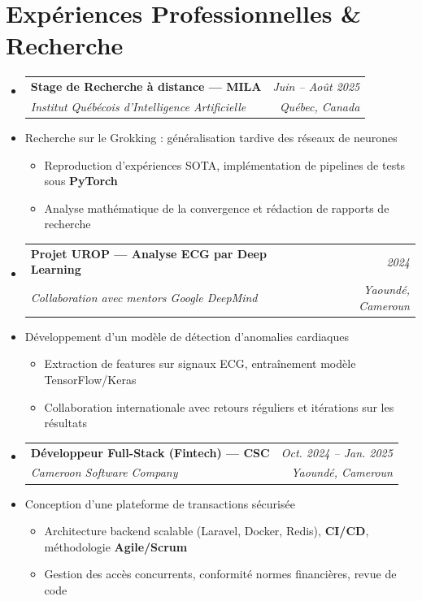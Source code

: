 \documentclass[a4paper,11pt]{article}
\makeatletter
\newcommand{\resumeItem}[1]{\item\small{#1}}
\newcommand{\resumeSubheading}[4]{
\vspace{-1pt}\item
\begin{tabular*}{0.97\textwidth}[t]{l@{\extracolsep{\fill}}r}
\textbf{#1} & \textit{\small #2} \\
\textit{\small #3} & \textit{\small #4} \\
\end{tabular*}\vspace{-5pt}
}
\makeatother
\begin{document}
\section{Expériences Professionnelles \& Recherche}
\begin{itemize}[leftmargin=*, label={}]

    \resumeSubheading
      {Stage de Recherche à distance — MILA}{Juin -- Août 2025}
      {Institut Québécois d'Intelligence Artificielle}{Québec, Canada}
      \resumeItem{Recherche sur le Grokking : généralisation tardive des réseaux de neurones}
      \begin{itemize}[leftmargin=0.4cm, nosep, label=\tiny$\bullet$]
        \item \small{Reproduction d'expériences SOTA, implémentation de pipelines de tests sous \textbf{PyTorch}}
        \item \small{Analyse mathématique de la convergence et rédaction de rapports de recherche}
      \end{itemize}
    \vspace{2pt}

    \resumeSubheading
      {Projet UROP — Analyse ECG par Deep Learning}{2024}
      {Collaboration avec mentors Google DeepMind}{Yaoundé, Cameroun}
      \resumeItem{Développement d'un modèle de détection d'anomalies cardiaques}
      \begin{itemize}[leftmargin=0.4cm, nosep, label=\tiny$\bullet$]
        \item \small{Extraction de features sur signaux ECG, entraînement modèle TensorFlow/Keras}
        \item \small{Collaboration internationale avec retours réguliers et itérations sur les résultats}
      \end{itemize}
    \vspace{2pt}

    \resumeSubheading
      {Développeur Full-Stack (Fintech) — CSC}{Oct. 2024 -- Jan. 2025}
      {Cameroon Software Company}{Yaoundé, Cameroun}
      \resumeItem{Conception d'une plateforme de transactions sécurisée}
      \begin{itemize}[leftmargin=0.4cm, nosep, label=\tiny$\bullet$]
        \item \small{Architecture backend scalable (Laravel, Docker, Redis), \textbf{CI/CD}, méthodologie \textbf{Agile/Scrum}}
        \item \small{Gestion des accès concurrents, conformité normes financières, revue de code}
      \end{itemize}
    \vspace{2pt}


\end{itemize}
\end{document}
